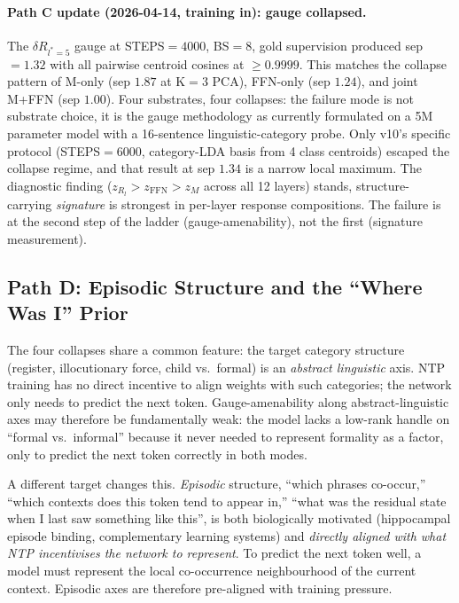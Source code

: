 \documentclass[11pt, a4paper]{article}
\theoremstyle{plain}
\theoremstyle{definition}
\theoremstyle{remark}
\begin{document}
\paragraph{Path C update (2026-04-14, training in): gauge collapsed.}
The $\delta R_{l^{*}{=}5}$ gauge at STEPS$=4000$, BS$=8$, gold supervision produced sep $=1.32$ with all pairwise centroid cosines at $\geq 0.9999$.
This matches the collapse pattern of M-only (sep $1.87$ at K$=3$ PCA), FFN-only (sep $1.24$), and joint M+FFN (sep $1.00$).
Four substrates, four collapses: the failure mode is not substrate choice, it is the gauge methodology as currently formulated on a 5M parameter model with a 16-sentence linguistic-category probe.
Only v10's specific protocol (STEPS$=6000$, category-LDA basis from 4 class centroids) escaped the collapse regime, and that result at sep $1.34$ is a narrow local maximum.
The diagnostic finding ($z_{R_l} > z_{\mathrm{FFN}} > z_M$ across all 12 layers) stands, structure-carrying \emph{signature} is strongest in per-layer response compositions.
The failure is at the second step of the ladder (gauge-amenability), not the first (signature measurement).

\subsection{Path D: Episodic Structure and the ``Where Was I'' Prior}
\label{sec:path-d-episodic}

The four collapses share a common feature: the target category structure (register, illocutionary force, child vs.\ formal) is an \emph{abstract linguistic} axis.
NTP training has no direct incentive to align weights with such categories; the network only needs to predict the next token.
Gauge-amenability along abstract-linguistic axes may therefore be fundamentally weak: the model lacks a low-rank handle on ``formal vs.\ informal'' because it never needed to represent formality as a factor, only to predict the next token correctly in both modes.

A different target changes this.
\emph{Episodic} structure, ``which phrases co-occur,'' ``which contexts does this token tend to appear in,'' ``what was the residual state when I last saw something like this'', is both biologically motivated (hippocampal episode binding, complementary learning systems) and \emph{directly aligned with what NTP incentivises the network to represent}.
To predict the next token well, a model must represent the local co-occurrence neighbourhood of the current context.
Episodic axes are therefore pre-aligned with training pressure.
\end{document}
